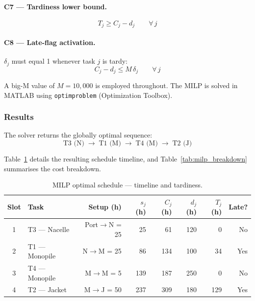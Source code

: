 \documentclass[11pt,a4paper]{article}
\begin{document}
\paragraph{C7 — Tardiness lower bound.}
\begin{equation}
    T_j \geq C_j - d_j
    \qquad \forall\, j
    \tag{C7}
\end{equation}

\paragraph{C8 — Late-flag activation.} $\delta_j$ must equal 1 whenever
task $j$ is tardy:
\begin{equation}
    C_j - d_j \leq M\,\delta_j
    \qquad \forall\, j
    \tag{C8}
\end{equation}

A big-M value of $M = 10{,}000$ is employed throughout. The MILP is solved
in MATLAB using \texttt{optimproblem} (Optimization Toolbox).

\subsubsection{Results}

The solver returns the globally optimal sequence:
\begin{equation}
    \text{T3 (N)} \;\to\; \text{T1 (M)} \;\to\; \text{T4 (M)} \;\to\; \text{T2 (J)}
    \label{eq:milp_seq}
\end{equation}

Table~\ref{tab:milp_timeline} details the resulting schedule timeline, and
Table~\ref{tab:milp_breakdown} summarises the cost breakdown.

\begin{table}[H]
\centering
\caption{MILP optimal schedule — timeline and tardiness.}
\label{tab:milp_timeline}
\begin{tabular}{clrrrrrr}
\toprule
\textbf{Slot} & \textbf{Task} & \textbf{Setup (h)} & \textbf{$s_j$ (h)} & \textbf{$C_j$ (h)} & \textbf{$d_j$ (h)} & \textbf{$T_j$ (h)} & \textbf{Late?} \\
\midrule
1 & T3 — Nacelle  & Port$\to$N = 25 & 25  &  61 & 120 &   0 & No  \\
2 & T1 — Monopile & N$\to$M = 25    & 86  & 134 & 100 &  34 & Yes \\
3 & T4 — Monopile & M$\to$M = 5     & 139 & 187 & 250 &   0 & No  \\
4 & T2 — Jacket   & M$\to$J = 50    & 237 & 309 & 180 & 129 & Yes \\
\bottomrule
\end{tabular}
\end{table}
\end{document}
